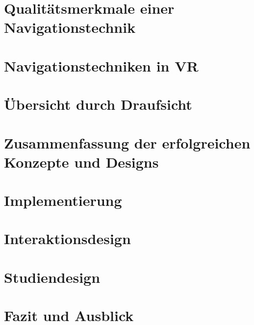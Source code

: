 \documentclass[fontsize=12pt, paper=a4, headinclude, twoside=false, parskip=half+, pagesize=auto, numbers=noenddot, plainheadsepline, open=right, toc=listof]{scrreprt}
\theoremstyle{hypothesisstyle}
\theoremstyle{shypothesisstyle}
\begin{document}
\chapter{Qualitätsmerkmale einer Navigationstechnik}


\chapter{Navigationstechniken in VR}


\chapter{Übersicht durch Draufsicht}


\chapter{Zusammenfassung der erfolgreichen Konzepte und Designs}



\chapter{Implementierung}


\chapter{Interaktionsdesign}


\chapter{Studiendesign}



\chapter{Fazit und Ausblick}


%



{\footnotesize
{}

}


%
\end{document}
